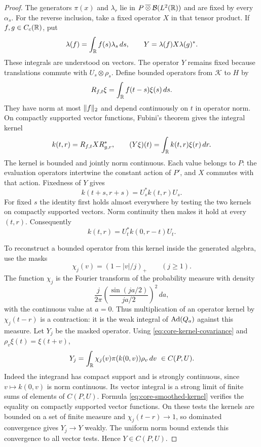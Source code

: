 \begin{proof}
The generators $\pi(x)$ and $\lambda_r$ lie in
$P\mathbin{\overline\otimes}\mathcal B(L^2(\mathbb R))$ and are fixed by every $\alpha_s$.
For the reverse inclusion, take a fixed operator $X$ in that tensor
product.  If $f,g\in C_c(\mathbb R)$, put
\[
 \lambda(f)=\int_\mathbb R f(s)\lambda_s\,ds,
 \qquad Y=\lambda(f)X\lambda(g)^*.
\]
These integrals are understood on vectors.  The operator $Y$ remains
fixed because translations commute with $U_s\otimes\rho_s$.
Define bounded operators from $\mathcal K$ to $H$ by
\[
 R_{f,t}\xi=\int_\mathbb R f(t-s)\xi(s)\,ds.
\]
They have norm at most $\lVert f\rVert_2$ and depend continuously on $t$
in operator norm.  On compactly supported vector functions, Fubini's
theorem gives the integral kernel
\begin{equation}\label{eq:core-smoothed-kernel}
 k(t,r)=R_{f,t}XR_{g,r}^*,\qquad
 (Y\xi)(t)=\int_\mathbb R k(t,r)\xi(r)\,dr.
\end{equation}
The kernel is bounded and jointly norm continuous.  Each value belongs
to $P$: the evaluation operators intertwine the constant action of
$P'$, and $X$ commutes with that action.  Fixedness of $Y$ gives
\[
 k(t+s,r+s)=U_s^*k(t,r)U_s.
\]
For fixed $s$ the identity first holds almost everywhere by testing the
two kernels on compactly supported vectors.  Norm continuity then
makes it hold at every $(t,r)$.  Consequently
\begin{equation}\label{eq:core-kernel-covariance}
 k(t,r)=U_t^*k(0,r-t)U_t.
\end{equation}

To reconstruct a bounded operator from this kernel inside the generated
algebra, use the masks
\[
 \chi_j(v)=(1-|v|/j)_+\qquad(j\ge1).
\]
The function $\chi_j$ is the Fourier transform of the probability
measure with density
\[
 \frac{j}{2\pi}
 \left(\frac{\sin(ja/2)}{ja/2}\right)^2\,da,
\]
with the continuous value at $a=0$.  Thus multiplication of an operator
kernel by $\chi_j(t-r)$ is a contraction: it is the weak integral of
$\operatorname{Ad}(Q_a)$ against this measure.  Let $Y_j$ be the masked operator.
Using \eqref{eq:core-kernel-covariance} and $\rho_v\xi(t)=\xi(t+v)$,
\begin{equation}\label{eq:core-kernel-reconstruction}
 Y_j=\int_\mathbb R
       \chi_j(v)\pi(k(0,v))\rho_v\,dv\ \in C(P,U).
\end{equation}
Indeed the integrand has compact support and is strongly continuous,
since $v\mapsto k(0,v)$ is norm continuous.  Its vector integral is a
strong limit of finite sums of elements of $C(P,U)$.  Formula
\eqref{eq:core-smoothed-kernel} verifies the equality on compactly
supported vector functions.  On these tests the kernels are bounded
on a set of finite measure and $\chi_j(t-r)\to1$, so dominated
convergence gives $Y_j\to Y$ weakly.  The uniform norm bound extends
this convergence to all vector tests.  Hence $Y\in C(P,U)$.


\end{proof}
